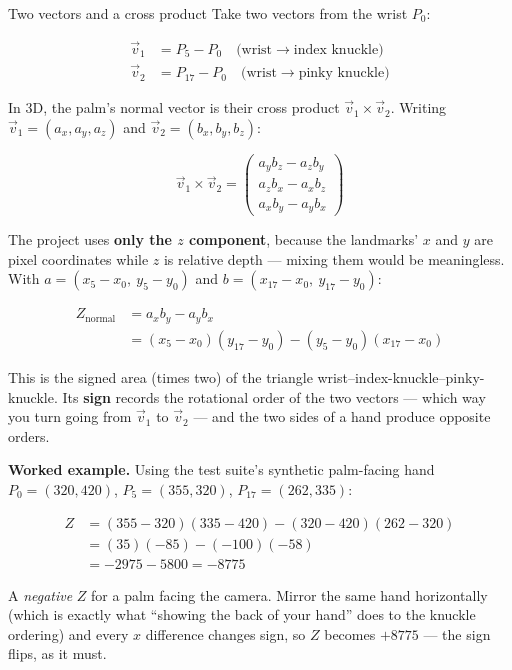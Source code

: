 \begin{mathdeepdive}{Two vectors and a cross product}
Take two vectors from the wrist $P_0$:

\begin{align*}
\vec{v}_1 &= P_5 - P_0 \quad \text{(wrist} \to \text{index knuckle)} \\
\vec{v}_2 &= P_{17} - P_0 \quad \text{(wrist} \to \text{pinky knuckle)}
\end{align*}

In 3D, the palm's normal vector is their cross product $\vec{v}_1 \times \vec{v}_2$. Writing
$\vec{v}_1 = (a_x, a_y, a_z)$ and $\vec{v}_2 = (b_x, b_y, b_z)$:

$$\vec{v}_1 \times \vec{v}_2 =
\begin{pmatrix} a_y b_z - a_z b_y \\ a_z b_x - a_x b_z \\ a_x b_y - a_y b_x \end{pmatrix}$$

The project uses \textbf{only the $z$ component}, because the landmarks' $x$ and $y$ are pixel
coordinates while $z$ is relative depth --- mixing them would be meaningless. With
$a = (x_5 - x_0,\ y_5 - y_0)$ and $b = (x_{17} - x_0,\ y_{17} - y_0)$:

\begin{align*}
Z_{\text{normal}} &= a_x b_y - a_y b_x \\
 &= (x_5 - x_0)(y_{17} - y_0) - (y_5 - y_0)(x_{17} - x_0)
\end{align*}

This is the signed area (times two) of the triangle wrist--index-knuckle--pinky-knuckle. Its
\textbf{sign} records the rotational order of the two vectors --- which way you turn going from
$\vec{v}_1$ to $\vec{v}_2$ --- and the two sides of a hand produce opposite orders.

\textbf{Worked example.} Using the test suite's synthetic palm-facing hand
$P_0 = (320,420)$, $P_5 = (355,320)$, $P_{17} = (262,335)$:

\begin{align*}
Z &= (355-320)(335-420) - (320-420)(262-320) \\
  &= (35)(-85) - (-100)(-58) \\
  &= -2975 - 5800 = -8775
\end{align*}

A \emph{negative} $Z$ for a palm facing the camera. Mirror the same hand horizontally (which is
exactly what ``showing the back of your hand'' does to the knuckle ordering) and every $x$ difference
changes sign, so $Z$ becomes $+8775$ --- the sign flips, as it must.
\end{mathdeepdive}

